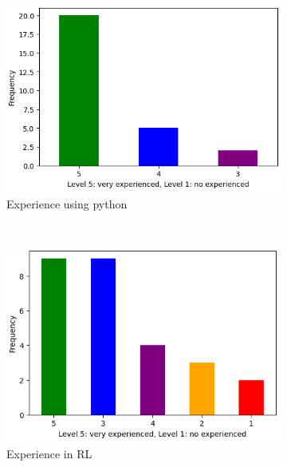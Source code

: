 \begin{figure}[hptb]
    \centering
    \begin{subfigure}[b]{0.45\textwidth}
        \centering
        \includegraphics[width=\textwidth]{figures/experience-python}
        \caption{Experience using python}
        \label{fig:python-experience}
    \end{subfigure}
    ~ 
    \begin{subfigure}[b]{0.45\textwidth}
        \centering
        \includegraphics[width=\textwidth]{figures/experience-rl}
        \caption{Experience in \ac{RL}}
        \label{fig:rl-experience}
    \end{subfigure}
    ~ 
    \begin{subfigure}[b]{0.45\textwidth}
        \centering

\end{subfigure}
\end{figure}
